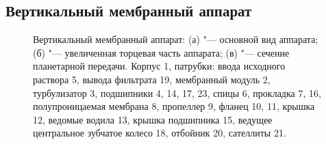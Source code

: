 \subsection{Вертикальный мембранный аппарат}

\begin{figure}[htb]
\centering
\begin{small}
\begin{subfigure}[htb]{\linewidth}
\centering
\def\svgwidth{10.5cm}

\caption{}
\label{fig:main_view_vertical_membrane1}
\end{subfigure}
\begin{subfigure}[htb]{0.45\linewidth}
\centering
\def\svgwidth{7cm}

\caption{}
\label{fig:main_view_vertical_membrane2}
\end{subfigure}
\begin{subfigure}[htb]{0.45\linewidth}
\centering
\def\svgwidth{7cm}

\caption{}
\label{fig:main_view_vertical_membrane3}
\end{subfigure}
\end{small}
\caption[Вертикальный мембранный аппарат]{Вертикальный мембранный аппарат: (а) "--- основной вид аппарата; (б) "--- увеличенная торцевая часть аппарата; (в) "--- сечение планетарной передачи. Корпус 1, патрубки: ввода исходного раствора 5, вывода фильтрата 19, мембранный модуль 2, турбулизатор 3, подшипники 4, 14, 17, 23, спицы 6, прокладка 7, 16, полупроницаемая мембрана 8, пропеллер 9, фланец 10, 11, крышка 12, ведомые водила 13, крышка подшипника 15, ведущее центральное зубчатое колесо 18, отбойник 20, сателлиты 21.}
\label{fig:patent_vertical_membrane_ap}
\end{figure}

